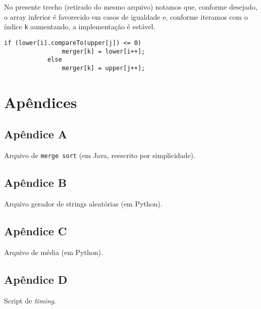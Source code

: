 \documentclass[12pt,reqno]{amsart}
\begin{document}
No presente trecho (retirado do mesmo arquivo) notamos que, conforme desejado,
o array inferior é favorecido em casos de igualdade e, conforme iteramos com
o índice \texttt{k} aumentando, a implementação é estável.

\begin{lstlisting}[firstnumber=37]
            if (lower[i].compareTo(upper[j]) <= 0)
                merger[k] = lower[i++];
            else
                merger[k] = upper[j++];
\end{lstlisting}


\clearpage
\section{Apêndices}

\subsection{Apêndice A}
\label{code:java}

Arquivo de \texttt{merge sort} (em Java, reescrito por simplicidade).

\lstset{language=Java}


\clearpage
\subsection{Apêndice B}
\label{code:python}

Arquivo gerador de strings aleatórias (em Python).

\lstset{language=Python}


\clearpage
\subsection{Apêndice C}
\label{code:python2}

Arquivo de média (em Python).



\clearpage
\subsection{Apêndice D}
\label{code:bash}

Script de \textit{timing}.

\lstset{language=Bash}

\end{document}
